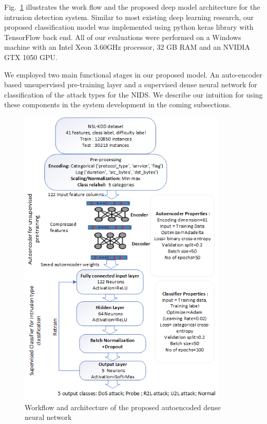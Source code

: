 \documentclass[runningheads]{llncs}
\newcommand{\fig}[1]{Fig.~\ref{#1}}
\begin{document}
 
\fig{fig:Architecture} illustrates the work flow and the proposed deep model architecture for the intrusion detection system. Similar to most existing deep learning research, our proposed classification model was implemented using python keras library \cite{keras} with TensorFlow back end. All of our evaluations were performed on a Windows machine with an Intel Xeon 3.60GHz processor, 32 GB RAM and an NVIDIA GTX 1050 GPU.


We employed two main functional stages in our proposed model. An auto-encoder based unsupervised pre-training layer and a supervised dense neural network for classification of the attack types for the NIDS. We describe our intuition for using these components in the system development in the coming subsections.

 \begin{figure}
      \centering
\includegraphics[width=0.89\textwidth]{Figures/NIDS_Autoencoder_Architecture.png}
\caption{Workflow and architecture of the proposed  autoencoded dense neural network}
      \label{fig:Architecture}
    \end{figure}
%
\end{document}
